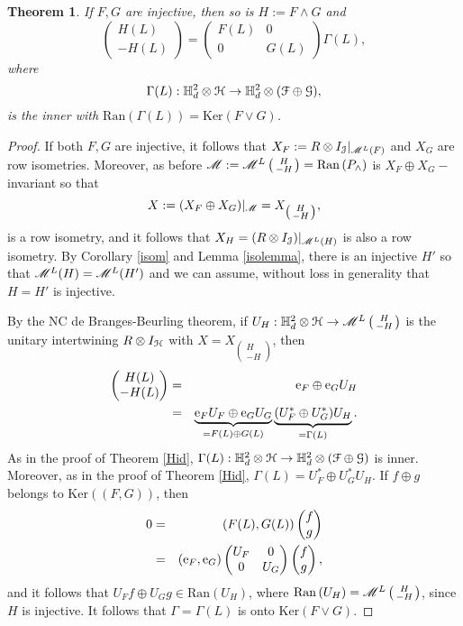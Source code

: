 \documentclass[11pt]{article}
\newcommand{\ba}{\begin{eqnarray}}
\newcommand{\ea}{\end{eqnarray}}
\newcommand{\bpm}{\begin{pmatrix}}
\newcommand{\epm}{\end{pmatrix}}
\newcommand{\bsm}{\left ( \begin{smallmatrix}}
\newcommand{\esm}{\end{smallmatrix} \right) }
\newcommand{\nn}{\nonumber}
\newcommand{\mr}{\ensuremath{\mathrm}}
\newcommand{\scr}{\ensuremath{\mathscr}}
\newcommand{\mc}{\ensuremath{\mathcal}}
\newcommand{\Ga}{\ensuremath{\Gamma}}
\def\bH{\mathbb{H}}
\renewcommand{\H}{\ensuremath{\mathcal{H} }}
\newcommand{\J}{\ensuremath{\mathcal{J} }}
\newcommand{\ran}[1]{\ensuremath{\mathrm{Ran} \left( {#1} \right) }}
\renewcommand{\ker}[1]{\ensuremath{\mathrm{Ker} \left( {#1} \right) }}
\numberwithin{equation}{section}
\numberwithin{subsection}{section}
\newtheorem{thm}[subsection]{Theorem}
\theoremstyle{definition}
\begin{document}
\begin{thm} \label{injfactor}
If $F,G$ are injective, then so is $H := F \wedge G$ and
$$ \bpm H(L) \\ - H(L) \epm  =  \bpm F(L) & 0 \\ 0 & G(L) \epm \Ga (L), $$ where 
$$ \Ga (L) : \bH ^2 _d \otimes \mc{H} \rightarrow \bH ^2 _d \otimes (\mc{F} \oplus \mc{G} ), $$ is the inner with $\ran{\Ga (L)} = \ker{F\vee G}$.
\end{thm}
\begin{proof}
If both $F,G$ are injective, it follows that $X_F:= R \otimes I_\J | _{\scr{M} ^L (F)}$ and $X_G$ are row isometries. Moreover, as before $\scr{M} := \scr{M} ^L \bsm H \\ - H \esm = \ran{P_\wedge}$ is $X_F \oplus X_G-$invariant so that 
$$ X:= (X_F \oplus X_G) | _{\scr{M} } = X_{\bsm H \\ - H \esm}, $$ is a row isometry, and it follows that $X_H = (R \otimes I_\mc{J} ) | _{\scr{M} ^L (H)}$ is also a row isometry. By Corollary \ref{isom} and Lemma \ref{isolemma}, there is an injective $H'$ so that $\scr{M} ^L (H ) = \scr{M} ^L (H' )$ and we can assume, without loss in generality that $H =H ' $ is injective. 

By the NC de Branges-Beurling theorem, if $U_H : \bH ^2 _d \otimes \mc{H} \rightarrow \scr{M} ^L \bsm H \\ - H \esm$ is the unitary intertwining $R \otimes I_\mc{H}$ with $X =X_{\bsm H \\ - H \esm}$, then
\ba \bpm H(L) \\ - H(L) \epm & = & \mr{e} _F \oplus \mr{e} _G U_H \nn \\
& = & \underbrace{\mr{e}_F U_F \oplus \mr{e} _G U_G}_{=F(L) \oplus G(L)} \underbrace{(U_F ^* \oplus U_G ^*) U_H}_{=\Ga (L)}. \nn \ea 
As in the proof of Theorem \ref{Hid}, $\Ga (L) : \bH ^2 _d \otimes \H \rightarrow \bH ^2 _d \otimes (\mc{F} \oplus \mc{G})$ is inner. Moreover, as in the proof of Theorem \ref{Hid}, $\Ga (L) = U_F ^* \oplus U_G ^* U_H$. If $f \oplus g$ belongs to $\ker{(F,G)}$, then 
\ba 0 & = & \left( F(L) , G(L) \right) \bpm f \\ g \epm \nn \\
& = & \left( \mr{e} _F , \mr{e} _G \right) \bpm U_F & 0 \\ 0 & U_G \epm \bpm f \\ g \epm, \nn \ea 
and it follows that $U_F f \oplus U_G g \in \ran{U_H}$, where $\ran{U_H} = \scr{M} ^L \bsm H \\ - H \esm$, since $H$ is injective. It follows that $\Ga = \Ga (L)$ is onto $\ker{F \vee G}$.
\end{proof}
\end{document}
